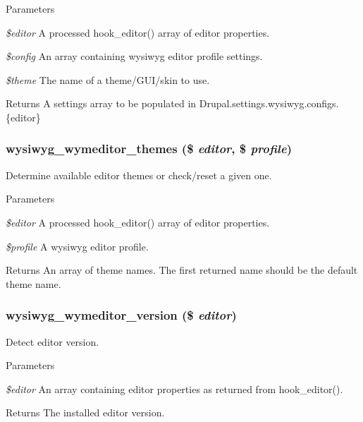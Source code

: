 \begin{DoxyParams}{Parameters}
\item[{\em \$editor}]A processed hook\_\-editor() array of editor properties. \item[{\em \$config}]An array containing wysiwyg editor profile settings. \item[{\em \$theme}]The name of a theme/GUI/skin to use.\end{DoxyParams}
\begin{DoxyReturn}{Returns}
A settings array to be populated in Drupal.settings.wysiwyg.configs.\{editor\} 
\end{DoxyReturn}
\hypertarget{wymeditor_8inc_a1e0a84cada74a2a5df209e79f62d5390}{
\subsubsection[{wysiwyg\_\-wymeditor\_\-themes}]{\setlength{\rightskip}{0pt plus 5cm}wysiwyg\_\-wymeditor\_\-themes (\$ {\em editor}, \/  \$ {\em profile})}}
\label{wymeditor_8inc_a1e0a84cada74a2a5df209e79f62d5390}
Determine available editor themes or check/reset a given one.


\begin{DoxyParams}{Parameters}
\item[{\em \$editor}]A processed hook\_\-editor() array of editor properties. \item[{\em \$profile}]A wysiwyg editor profile.\end{DoxyParams}
\begin{DoxyReturn}{Returns}
An array of theme names. The first returned name should be the default theme name. 
\end{DoxyReturn}
\hypertarget{wymeditor_8inc_a64bf50fc3ee98619606f13b160edf7a8}{
\subsubsection[{wysiwyg\_\-wymeditor\_\-version}]{\setlength{\rightskip}{0pt plus 5cm}wysiwyg\_\-wymeditor\_\-version (\$ {\em editor})}}
\label{wymeditor_8inc_a64bf50fc3ee98619606f13b160edf7a8}
Detect editor version.


\begin{DoxyParams}{Parameters}
\item[{\em \$editor}]An array containing editor properties as returned from hook\_\-editor().\end{DoxyParams}
\begin{DoxyReturn}{Returns}
The installed editor version. 
\end{DoxyReturn}

